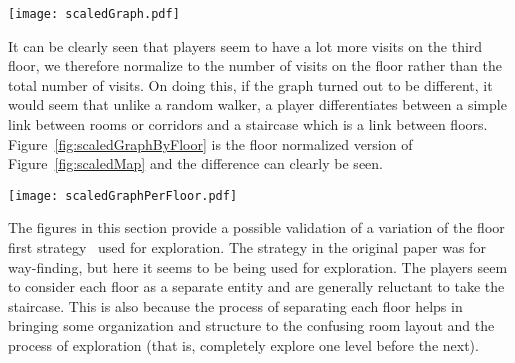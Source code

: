 \begin{sidewaysfigure*}[!htbp]
\centering
\texttt{[image: scaledGraph.pdf]}
\caption{Figure~\ref{fig:UnscaledMap} scaled by normalized number of visits as described in Equation~\ref{eq:y_equation}. Red color indicates a $y$ value of greater than $1.05$ and the green color indicates a value of less than $0.95$. The diameter of each node in this graph is scaled to $y_r \times (unscaled\ diameter)$.}
\label{fig:scaledMap}
\end{sidewaysfigure*}

It can be clearly seen that players seem to have a lot more visits on the third floor, we therefore normalize to the number of visits on the floor rather than the total number of visits. On doing this, if the graph turned out to be different, it would seem that unlike a random walker, a player differentiates between a simple link between rooms or corridors and a staircase which is a link between floors. Figure~\ref{fig:scaledGraphByFloor} is the floor normalized version of Figure~\ref{fig:scaledMap} and the difference can clearly be seen.

\begin{sidewaysfigure*}[!htbp]
\centering
\texttt{[image: scaledGraphPerFloor.pdf]}
\caption{Figure~\ref{fig:scaledMap} normalized to floor instead of the total number of visits. The fact that this graph is different from Figure~\ref{fig:scaledMap} indicates that, unlike a random walker, a player differentiates betwen a simple link between rooms or corridors and a staircase which links two floors.}
\label{fig:scaledGraphByFloor}
\end{sidewaysfigure*}





The figures in this section provide a possible validation of a variation of the floor first strategy~\cite{HolscherBMS06} used for exploration. The strategy in the original paper was for way-finding, but here it seems to be being used for exploration. The players seem to consider each floor as a separate entity and are generally reluctant to take the staircase. This is also because the process of separating each floor helps in bringing some organization and structure to the confusing room layout and the process of exploration (that is, completely explore one level before the next).

